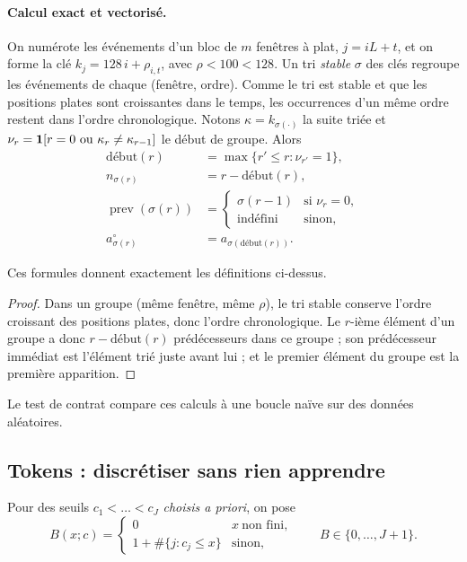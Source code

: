 \paragraph{Calcul exact et vectorisé.}
On numérote les événements d'un bloc de $m$ fenêtres à plat, $j=iL+t$, et on forme la clé $k_j=128\,i+\rho_{i,t}$, avec $\rho<100<128$. Un tri \emph{stable} $\sigma$ des clés regroupe les événements de chaque (fenêtre, ordre). Comme le tri est stable et que les positions plates sont croissantes dans le temps, les occurrences d'un même ordre restent dans l'ordre chronologique. Notons $\kappa=k_{\sigma(\cdot)}$ la suite triée et $\nu_r=\ind{r=0\ \text{ou}\ \kappa_r\neq\kappa_{r-1}}$ le début de groupe. Alors
\begin{align}
\text{début}(r)&=\max\{r'\le r:\nu_{r'}=1\},\\
n_{\sigma(r)}&=r-\text{début}(r),\\
\operatorname{prev}(\sigma(r))&=\begin{cases}\sigma(r-1)&\text{si }\nu_r=0,\\\text{indéfini}&\text{sinon,}\end{cases}\\
a^{\circ}_{\sigma(r)}&=a_{\sigma(\text{début}(r))}.
\end{align}
\begin{proposition}
Ces formules donnent exactement les définitions ci-dessus.
\end{proposition}
\begin{proof}
Dans un groupe (même fenêtre, même $\rho$), le tri stable conserve l'ordre croissant des positions plates, donc l'ordre chronologique. Le $r$-ième élément d'un groupe a donc $r-\text{début}(r)$ prédécesseurs dans ce groupe ; son prédécesseur immédiat est l'élément trié juste avant lui ; et le premier élément du groupe est la première apparition.
\end{proof}
\noindent Le test de contrat compare ces calculs à une boucle naïve sur des données aléatoires.

\subsection{Tokens : discrétiser sans rien apprendre}
\begin{definition}
Pour des seuils $c_1<\dots<c_J$ \emph{choisis a priori}, on pose
\begin{equation}
B(x;c)=\begin{cases}0&x\ \text{non fini},\\1+\#\{j:c_j\le x\}&\text{sinon,}\end{cases}\qquad B\in\{0,\dots,J+1\}.
\end{equation}
\end{definition}

